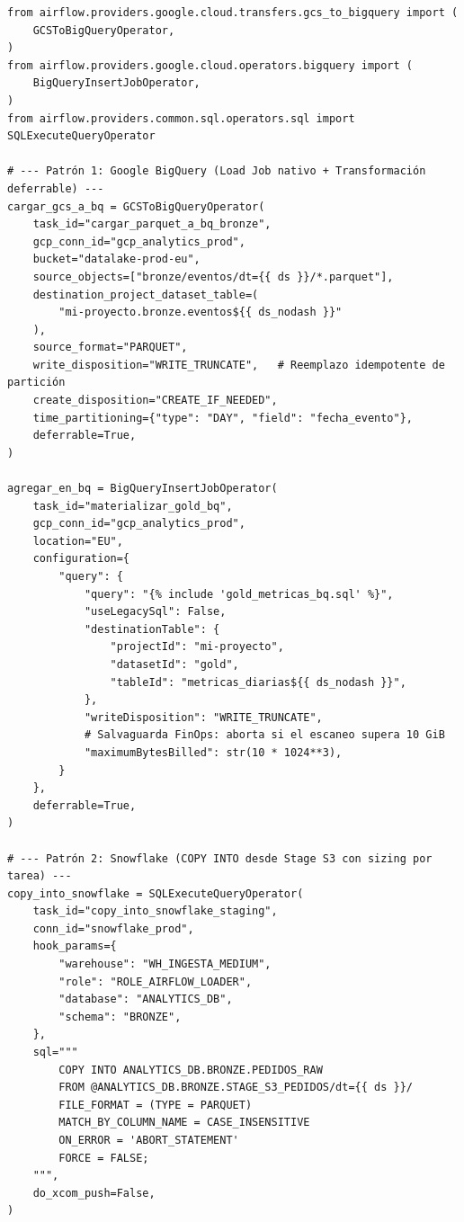 \begin{lstlisting}[style=python, caption={Patrones de producción en BigQuery (carga nativa + límite de coste) y Snowflake (\texttt{COPY INTO} con \texttt{hook\_params}).}, label={lst:dw-bigquery-snowflake}]
from airflow.providers.google.cloud.transfers.gcs_to_bigquery import (
    GCSToBigQueryOperator,
)
from airflow.providers.google.cloud.operators.bigquery import (
    BigQueryInsertJobOperator,
)
from airflow.providers.common.sql.operators.sql import SQLExecuteQueryOperator

# --- Patrón 1: Google BigQuery (Load Job nativo + Transformación deferrable) ---
cargar_gcs_a_bq = GCSToBigQueryOperator(
    task_id="cargar_parquet_a_bq_bronze",
    gcp_conn_id="gcp_analytics_prod",
    bucket="datalake-prod-eu",
    source_objects=["bronze/eventos/dt={{ ds }}/*.parquet"],
    destination_project_dataset_table=(
        "mi-proyecto.bronze.eventos${{ ds_nodash }}"
    ),
    source_format="PARQUET",
    write_disposition="WRITE_TRUNCATE",   # Reemplazo idempotente de partición
    create_disposition="CREATE_IF_NEEDED",
    time_partitioning={"type": "DAY", "field": "fecha_evento"},
    deferrable=True,
)

agregar_en_bq = BigQueryInsertJobOperator(
    task_id="materializar_gold_bq",
    gcp_conn_id="gcp_analytics_prod",
    location="EU",
    configuration={
        "query": {
            "query": "{% include 'gold_metricas_bq.sql' %}",
            "useLegacySql": False,
            "destinationTable": {
                "projectId": "mi-proyecto",
                "datasetId": "gold",
                "tableId": "metricas_diarias${{ ds_nodash }}",
            },
            "writeDisposition": "WRITE_TRUNCATE",
            # Salvaguarda FinOps: aborta si el escaneo supera 10 GiB
            "maximumBytesBilled": str(10 * 1024**3),
        }
    },
    deferrable=True,
)

# --- Patrón 2: Snowflake (COPY INTO desde Stage S3 con sizing por tarea) ---
copy_into_snowflake = SQLExecuteQueryOperator(
    task_id="copy_into_snowflake_staging",
    conn_id="snowflake_prod",
    hook_params={
        "warehouse": "WH_INGESTA_MEDIUM",
        "role": "ROLE_AIRFLOW_LOADER",
        "database": "ANALYTICS_DB",
        "schema": "BRONZE",
    },
    sql="""
        COPY INTO ANALYTICS_DB.BRONZE.PEDIDOS_RAW
        FROM @ANALYTICS_DB.BRONZE.STAGE_S3_PEDIDOS/dt={{ ds }}/
        FILE_FORMAT = (TYPE = PARQUET)
        MATCH_BY_COLUMN_NAME = CASE_INSENSITIVE
        ON_ERROR = 'ABORT_STATEMENT'
        FORCE = FALSE;
    """,
    do_xcom_push=False,
)
\end{lstlisting}

